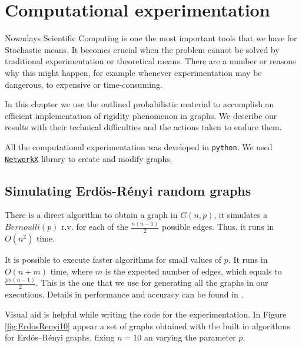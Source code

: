 
\chapter{Computational experimentation} %

\label{Chapter3} %



Nowadays Scientific Computing is one the most important tools that we have for Stochastic means. It becomes crucial when the problem cannot be solved by traditional experimentation or theoretical means. There are a number or reasons why this might happen, for example whenever experimentation may be dangerous, to expensive or time-consuming.

In this chapter we use the outlined probabilistic material to accomplish an efficient implementation of rigidity phenomenon in graphs. We describe our results with their technical difficulties and the actions taken to endure them.

All the computational experimentation was developed in \texttt{python}. We used \texttt{\href{https://networkx.github.io/}{NetworkX}} library to create and modify graphs.

\section{Simulating Erdös-Rényi random graphs}

There is a direct algorithm to obtain a graph in $G(n,p)$, it simulates a $Bernoulli(p)$ r.v. for each of the $\frac{n(n-1)}{2}$ possible edges. Thus, it runs in $O(n^2)$ time. 

It is possible to execute faster algorithms for small values of $p$. It runs in $O(n + m)$ time, where $m$ is the expected number of edges, which equals to $\frac{pn(n - 1)}{2}$. This is the one that we use for generating all the graphs in our executions. Details in performance and accuracy can be found in \cite[Batagelj, Brandes 05]{fastER}.

Visual aid is helpful while writing the code for the experimentation. In Figure \ref{fig:ErdosRenyi10} appear a set of graphs obtained with the built in algorithms for Erdös–Rényi graphs, fixing $n=10$ an varying the parameter $p$.


